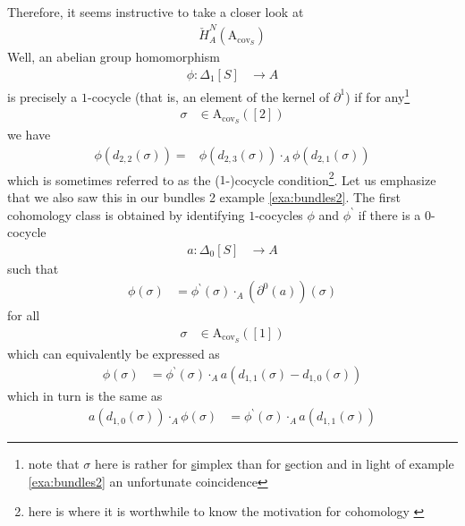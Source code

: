 Therefore, it seems instructive to take a closer look at
\begin{align*}
  \check{H}_{A}^{N}
  \left(
    \mathrm{A}_{\mathrm{cov}_{S}}
  \right)
\end{align*}
Well, an abelian group homomorphism
\begin{align*}
  \phi
  \colon
  \Delta_{1}[S]
  &\rightarrow
  A
\end{align*}
is precisely a $1$-cocycle (that is, an element of the kernel of $\partial^{1}$) if for any\footnote{note that $\sigma$ here is rather for \underline{s}implex than for \underline{s}ection and in light of example \ref{exa:bundles2} an unfortunate coincidence}
\begin{align*}
  \sigma
  &\in
  \mathrm{A}_{\mathrm{cov}_{S}}
  ([2])
\end{align*}
we have
\begin{align*}
  \phi
  \left(
    d_{2,2}(\sigma)
  \right)
  =
  &\phi
  \left(
    d_{2,3}(\sigma)
  \right)
  \cdot_{A}
  \phi
  \left(
    d_{2,1}(\sigma)
  \right)
\end{align*}
which is sometimes referred to as the ($1$-)cocycle condition\footnote{here is where it is worthwhile to know the motivation for cohomology \cite{8b5861fc}}.
Let us emphasize that we also saw this in our bundles 2 example \ref{exa:bundles2}.
The first cohomology class is obtained by identifying $1$-cocycles $\phi$ and $\phi^{\backprime}$ if there is a $0$-cocycle
\begin{align*}
  a
  \colon
  \Delta_{0}[S]
  &\rightarrow
  A
\end{align*}
such that
\begin{align*}
  \phi(\sigma)
  &=
  \phi^{\backprime}(\sigma)
  \cdot_{A}
  \left(
    \partial^{0}
    \left(
      a
    \right)
  \right)
  (\sigma)
\end{align*}
for all
\begin{align*}
  \sigma
  &\in
  \mathrm{A}_{\mathrm{cov}_{S}}
  ([1])
\end{align*}
which can equivalently be expressed as
\begin{align*}
  \phi(\sigma)
  &=
  \phi^{\backprime}(\sigma)
  \cdot_{A}
  a
  \left(
    d_{1,1}(\sigma)
    -
    d_{1,0}(\sigma)
  \right)
\end{align*}
which in turn is the same as
\begin{align*}
  a
  \left(
    d_{1,0}(\sigma)
  \right)
  \cdot_{A}
  \phi(\sigma)
  &=
  \phi^{\backprime}(\sigma)
  \cdot_{A}
  a
  \left(
    d_{1,1}(\sigma)
  \right)
\end{align*}
